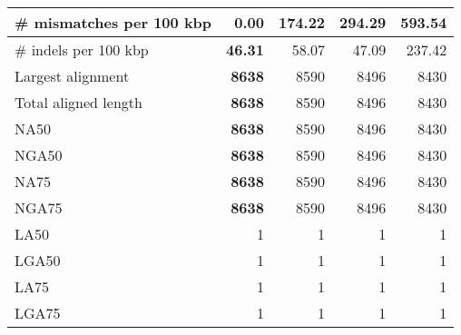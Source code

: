 \documentclass[12pt,a4paper]{article}
\begin{document}
\begin{table}[ht]
\begin{center}
\begin{tabular}{|l*{4}{|r}|}
\# mismatches per 100 kbp & {\bf 0.00} & 174.22 & 294.29 & 593.54 \\ \hline
\# indels per 100 kbp & {\bf 46.31} & 58.07 & 47.09 & 237.42 \\ \hline
Largest alignment & {\bf 8638} & 8590 & 8496 & 8430 \\ \hline
Total aligned length & {\bf 8638} & 8590 & 8496 & 8430 \\ \hline
NA50 & {\bf 8638} & 8590 & 8496 & 8430 \\ \hline
NGA50 & {\bf 8638} & 8590 & 8496 & 8430 \\ \hline
NA75 & {\bf 8638} & 8590 & 8496 & 8430 \\ \hline
NGA75 & {\bf 8638} & 8590 & 8496 & 8430 \\ \hline
LA50 & 1 & 1 & 1 & 1 \\ \hline
LGA50 & 1 & 1 & 1 & 1 \\ \hline
LA75 & 1 & 1 & 1 & 1 \\ \hline
LGA75 & 1 & 1 & 1 & 1 \\ \hline
\end{tabular}
\end{center}
\end{table}
\end{document}
